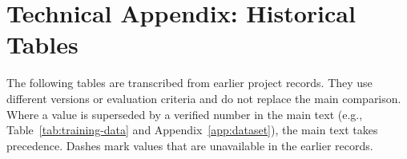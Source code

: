 \section{Technical Appendix: Historical Tables}
\label{app:historical}
The following tables are transcribed from earlier project records. They use different versions or evaluation criteria and do not replace the main comparison. Where a value is superseded by a verified number in the main text (e.g., Table~\ref{tab:training-data} and Appendix~\ref{app:dataset}), the main text takes precedence. Dashes mark values that are unavailable in the earlier records.

